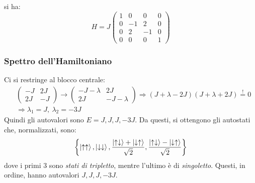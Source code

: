 \documentclass[10pt, a4paper]{scrartcl} %
\numberwithin{equation}{subsection}
\theoremstyle{style2}
\theoremstyle{style1}
\begin{document}
si ha:
\begin{equation}
	H = J \begin{pmatrix} 1& 0&0&0 \\ 0 & -1 & 2 & 0 \\ 0&2 & -1 & 0 \\ 0&0&0&1 \end{pmatrix} 
\end{equation}
\subsubsection{Spettro dell'Hamiltoniano}

Ci si restringe al blocco centrale:
\begin{equation}
	\begin{split}
		& \begin{pmatrix} -J & 2J \\ 2J & - J \end{pmatrix} \to  \begin{pmatrix} - J -\lambda & 2J \\ 2J & - J - \lambda  \end{pmatrix} \Rightarrow (J+\lambda  - 2J) (J+\lambda +2J) \stackrel{!}{=} 0 \\
		&\Rightarrow \lambda_1 = J, \ \lambda_2 = - 3J
	\end{split}
\end{equation}
Quindi gli autovalori sono $E= J,J,J, - 3J$. Da questi, si ottengono gli autostati che, normalizzati, sono:
\begin{equation}
	\left\{ \ket{\uparrow \uparrow} , \ket{\downarrow \downarrow}, \frac{\ket{\uparrow \downarrow} + \ket{\downarrow \uparrow} }{\sqrt{2} }, \frac{\ket{\uparrow \downarrow} - \ket{\downarrow\uparrow} }{\sqrt{2} }  \right\} 
\end{equation}
dove i primi 3 sono \textit{stati di tripletto}, mentre l'ultimo \`e di \textit{singoletto}. Questi, in ordine, hanno autovalori $J,J,J,-3J$.
\end{document}
